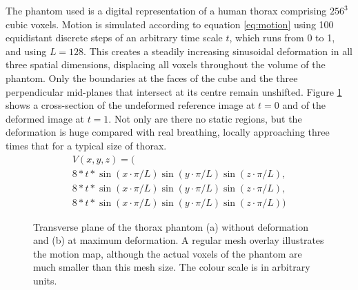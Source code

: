 The phantom used is a digital representation\cite{xcatweb} of a human thorax comprising $256^3$ cubic voxels.  Motion is simulated according to equation \ref{eq:motion} using 100 equidistant discrete steps of an arbitrary time scale $t$, which runs from 0 to 1, and using $L=128$.  This creates a steadily increasing sinusoidal deformation in all three spatial dimensions, displacing all voxels throughout the volume of the phantom.  Only the boundaries at the faces of the cube and the three perpendicular mid-planes that intersect at its centre remain unshifted.  Figure \ref{fig:motion_Res2} shows a cross-section of the undeformed reference image at $t=0$ and of the deformed image at $t=1$.  Not only are there no static regions, but the deformation is huge compared with real breathing\cite{Liu2007531}, locally approaching three times that for a typical size of thorax.
\begin{eqnarray}
V(x,y,z) = \bigl(\nonumber\\
8*t*\sin(x \cdot \pi/L)\sin(y \cdot \pi/L)\sin(z \cdot \pi/L),\nonumber \\
8*t*\sin(x \cdot \pi/L)\sin(y \cdot \pi/L)\sin(z \cdot \pi/L),\nonumber\\
8*t*\sin(x \cdot \pi/L)\sin(y \cdot \pi/L)\sin(z \cdot \pi/L)\bigr)
\label{eq:motion}
\end{eqnarray}



\begin{figure}
\begin{center} 
\caption{\label{fig:motion_Res2} Transverse plane of the thorax phantom (a) without deformation and (b) at maximum deformation.  A regular mesh overlay illustrates the motion map, although the actual voxels of the phantom are much smaller than this mesh size.  The colour scale is in arbitrary units.} 
\end{center} 
\end{figure}

